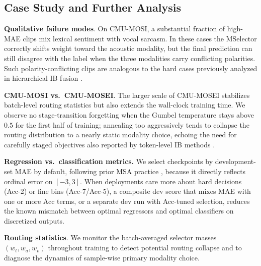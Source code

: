 \subsection{Case Study and Further Analysis}
\label{sec:res-qual}

\noindent \textbf{Qualitative failure modes}.
On CMU-MOSI, a substantial fraction of high-MAE clips mix lexical sentiment
with vocal sarcasm.
In these cases the MSelector correctly shifts weight toward the acoustic
modality, but the final prediction can still disagree with the label when
the three modalities carry conflicting polarities.
Such polarity-conflicting clips are analogous to the hard cases previously
analyzed in hierarchical IB fusion \citep{ithp2024align}.

\noindent \textbf{CMU-MOSI vs.\ CMU-MOSEI}.
The larger scale of CMU-MOSEI stabilizes batch-level routing statistics but
also extends the wall-clock training time.
We observe no stage-transition forgetting when the Gumbel temperature stays
above $0.5$ for the first half of training; annealing too aggressively tends
to collapse the routing distribution to a nearly static modality choice,
echoing the need for carefully staged objectives also reported by
token-level IB methods \citep{cyin2025align}.

\noindent \textbf{Regression vs.\ classification metrics.}
We select checkpoints by development-set MAE by default, following prior MSA
practice \citep{hazarika2020misa,han2021mmim}, because it directly reflects
ordinal error on $[-3,3]$.
When deployments care more about hard decisions (Acc-2) or fine bins
(Acc-7/Acc-5), a composite dev score that mixes MAE with one or more Acc
terms, or a separate dev run with Acc-tuned selection, reduces the known
mismatch between optimal regressors and optimal classifiers on discretized
outputs.

\noindent \textbf{Routing statistics}.
We monitor the batch-averaged selector masses $(w_t, w_a, w_v)$ throughout
training to detect potential routing collapse and to diagnose the dynamics of
sample-wise primary modality choice.
